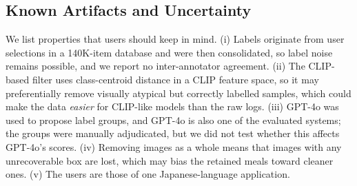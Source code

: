 \documentclass[sigconf, nonacm]{acmart}
\begin{document}
\begin{table}[t]
  \centering
  \caption{Comparison of distribution metrics between FoodLogAthl-218 and UEC-Food 256 using feature extractors. Higher \emph{Trace} and \emph{Davies--Bouldin} indicate greater spread, while lower \emph{Silhouette} and \emph{Calinski--Harabasz} indicate less compact clusters. Bold marks the value indicating greater spread or lower compactness.}
  \label{tab:diversity}
\end{table}

\subsection{Known Artifacts and Uncertainty}
We list properties that users should keep in mind. (i) Labels originate from user selections in a 140K-item database and were then consolidated, so label noise remains possible, and we report no inter-annotator agreement. (ii) The CLIP-based filter uses class-centroid distance in a CLIP feature space, so it may preferentially remove visually atypical but correctly labelled samples, which could make the data \emph{easier} for CLIP-like models than the raw logs. (iii) GPT-4o was used to propose label groups, and GPT-4o is also one of the evaluated systems; the groups were manually adjudicated, but we did not test whether this affects GPT-4o's scores. (iv) Removing images as a whole means that images with any unrecoverable box are lost, which may bias the retained meals toward cleaner ones. (v) The users are those of one Japanese-language application.
\end{document}
